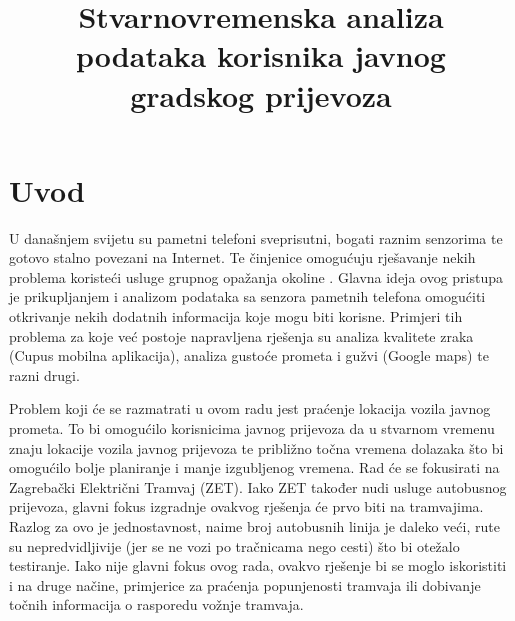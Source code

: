 \documentclass[times, utf8, diplomski]{fer}
\begin{document}

\title{Stvarnovremenska analiza podataka korisnika javnog gradskog prijevoza}




\zahvala{}

\tableofcontents




\chapter{Uvod}

U današnjem svijetu su pametni telefoni sveprisutni, bogati raznim senzorima te gotovo stalno povezani na Internet. 
Te činjenice omogućuju rješavanje nekih problema koristeći usluge grupnog opažanja okoline .
Glavna ideja ovog pristupa je prikupljanjem i analizom podataka sa senzora pametnih telefona omogućiti otkrivanje nekih dodatnih informacija koje mogu biti korisne.
Primjeri tih problema za koje već postoje napravljena rješenja su analiza kvalitete zraka (Cupus mobilna aplikacija), analiza gustoće prometa i gužvi (Google maps) te razni drugi.

Problem koji će se razmatrati u ovom radu jest praćenje lokacija vozila javnog prometa. To bi omogućilo korisnicima javnog prijevoza da u stvarnom vremenu znaju lokacije vozila javnog prijevoza te približno točna vremena dolazaka što bi omogućilo bolje planiranje i manje izgubljenog vremena. Rad će se fokusirati na Zagrebački Električni Tramvaj (ZET). Iako ZET također nudi usluge autobusnog prijevoza, glavni fokus izgradnje ovakvog rješenja će prvo biti na tramvajima. Razlog za ovo je jednostavnost, naime broj autobusnih linija je daleko veći, rute su nepredvidljivije (jer se ne vozi po tračnicama nego cesti) što bi otežalo testiranje.
Iako nije glavni fokus ovog rada, ovakvo rješenje bi se moglo iskoristiti i na druge načine, primjerice za praćenja popunjenosti tramvaja ili dobivanje točnih informacija o rasporedu vožnje tramvaja.
\end{document}
